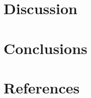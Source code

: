 \documentclass[
  spanish,
  a4paper,
  oneside]{scrbook}
\begin{document}

\chapter{Discussion}\label{discussion}


\chapter{Conclusions}\label{conclusions}


\chapter{References}\label{references}
\end{document}

